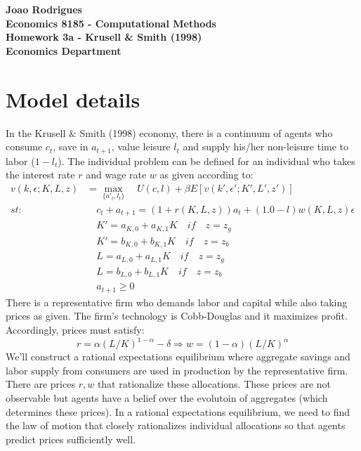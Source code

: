 \documentclass{article} %
\begin{document}
\begin{center}
  \textbf{Joao Rodrigues} \\
  \textbf{Economics 8185 - Computational Methods} \\
  \textbf{Homework 3a - Krusell \& Smith (1998)} \\
  \textbf{Economics Department}
\end{center}
\section*{Model details}
In the Krusell \& Smith (1998) economy, there is a continuum of agents who consume $c_t$, save in $a_{t+1}$, value leisure $l_t$ and supply his/her non-leisure time to labor ($1-l_{t}$). The individual problem can be defined for an individual who takes the interest rate $r$ and wage rate $w$ as given according to:
\begin{align*}
  v(k,\epsilon;K,L,z) & = \max_{\{a'_t, l_t\}}  \quad  U(c,l) + \beta E[v(k',\epsilon';K',L',z')]   \\
  st:  & \quad c_t + a_{t+1} = (1+r(K,L,z))a_{t} + (1.0-l)w(K,L,z)\epsilon\\
       & \quad K' = a_{K,0} + a_{K,1}K\quad if \quad z = z_g \\
       & \quad K' = b_{K,0} + b_{K,1}K\quad if \quad z = z_b \\ 
       & \quad L = a_{L,0} + a_{L,1}K\quad if \quad z = z_g \\
       & \quad L = b_{L,0} + b_{L,1}K\quad if \quad z = z_b \\ 
           & \quad a_{t+1} \geq 0
\end{align*}
There is a representative firm who demands labor and capital while also taking prices as given. The firm's technology is Cobb-Douglas and it maximizes profit. Accordingly, prices must satisfy: 
$$r = \alpha (L/K)^{1-\alpha} - \delta \Rightarrow w = (1-\alpha)(L/K)^{\alpha} $$
We'll construct a rational expectations equilibrium where aggregate savings and labor supply from consumers are used in production by the representative firm. There are prices $r,w$ that rationalize these allocations. These prices are not observable but agents have a belief over the evolutoin of aggregates (which determines these prices). In a rational expectations equilibrium, we need to find the law of motion that closely rationalizes individual allocations so that agents predict prices sufficiently well. 
\end{document}
